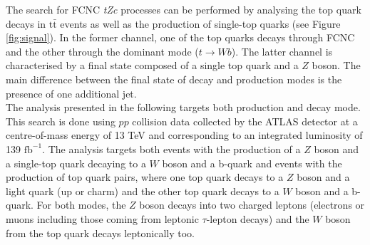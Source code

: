 \noindent The search for FCNC \textit{tZc} processes can be performed by analysing the top quark decays in $\mathrm{t\bar{t}}$ events as well as the production of single-top quarks (see Figure \ref{fig:signal}). In the former channel, one of the top quarks decays through FCNC and the other through the dominant mode ($t\to Wb$). The latter channel is characterised by a final state composed of a single top quark and a $Z$ boson. The main difference between the final state of decay and production modes is the presence of one additional jet. \\
The analysis presented in the following targets both production and decay mode. This search is done using $pp$ collision data collected by the ATLAS detector at a centre-of-mass energy of 13 TeV and corresponding to an integrated luminosity of 139 $\mathrm{fb^{-1}}$. The analysis targets both events with the production of a $Z$ boson and a single-top quark decaying to a $W$ boson and a b-quark and events with the production of top quark pairs, where one top quark decays to a $Z$ boson and a light quark (up or charm) and the other top quark decays to a $W$ boson and a b-quark. For both modes, the $Z$ boson decays into two charged leptons (electrons or muons including those coming from leptonic $\tau$-lepton decays) and the $W$ boson from the top quark decays leptonically too. \\

